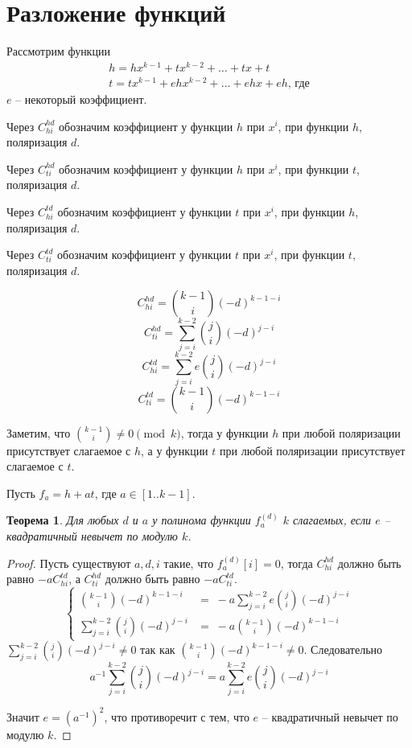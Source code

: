 \documentclass [12pt, a4paper] {article}
\newtheorem{myth}{Теорема}
\begin{document}
\section{Разложение функций}
Рассмотрим функции
\[ \begin{array}{l}
    h = hx^{k-1} + tx^{k-2} + \dots + tx + t \\
    t = tx^{k-1} + ehx^{k-2} + \dots + ehx + eh \text{, где}
\end{array} \]
$e$ -- некоторый коэффициент.

Через $C^{hd}_{hi}$ обозначим коэффициент у функции $h$ при $x^i$, при 
функции $h$, поляризация $d$.

Через $C^{hd}_{ti}$ обозначим коэффициент у функции $h$ при $x^i$, при 
функции $t$, поляризация $d$.

Через $C^{td}_{hi}$ обозначим коэффициент у функции $t$ при $x^i$, при 
функции $h$, поляризация $d$.

Через $C^{td}_{ti}$ обозначим коэффициент у функции $t$ при $x^i$, при 
функции $t$, поляризация $d$.

\[ C^{hd}_{hi} = \binom{k-1}{i}(-d)^{k-1-i} \]
\[ C^{hd}_{ti} = \sum_{j=i}^{k-2} \binom{j}{i}(-d)^{j-i} \]
\[ C^{td}_{hi} = \sum_{j=i}^{k-2} e \binom{j}{i}(-d)^{j-i} \]
\[ C^{td}_{ti} = \binom{k-1}{i}(-d)^{k-1-i} \]

Заметим, что $\binom{k-1}{i} \neq 0 \pmod k$, тогда у функции $h$ при любой
поляризации присутствует слагаемое с $h$, а у функции $t$ при любой поляризации
присутствует слагаемое с $t$.

Пусть $f_a = h + at$, где $a \in [1 .. k-1]$.

\begin{myth}
    Для любых $d$ и $a$ у полинома функции $f^{(d)}_a$ $k$ слагаемых, если $e$
    -- квадратичный невычет по модулю $k$.
\end{myth}
\begin{proof}
    Пусть существуют $a, d, i$ такие, что $f^{(d)}_a[i] = 0$, тогда
    $C^{hd}_{hi}$ должно быть равно $-a C^{td}_{hi}$, а $C^{hd}_{ti}$ должно
    быть равно $-a C^{td}_{ti}$.
    \begin{equation*}
        \begin{cases}
            \binom{k-1}{i}(-d)^{k-1-i} & = \; 
                -a \sum\limits_{j=i}^{k-2} e \binom{j}{i} (-d)^{j-i} \\
            \sum\limits_{j=i}^{k-2} \binom{j}{i} (-d)^{j-i} & = \;
                -a \binom{k-1}{i}(-d)^{k-1-i} 
        \end{cases}
    \end{equation*} 
    $\sum\limits_{j=i}^{k-2} \binom{j}{i} (-d)^{j-i} \neq 0$ так как
    $\binom{k-1}{i}(-d)^{k-1-i} \neq 0$.
    Следовательно 
    \[
        a^{-1} \sum_{j=i}^{k-2} \binom{j}{i} (-d)^{j-i} =
            a \sum_{j=i}^{k-2} e \binom{j}{i} (-d)^{j-i}
    \]

    Значит $e = (a^{-1})^2$, что противоречит с тем, что $e$ -- квадратичный
    невычет по модулю $k$.
\end{proof}
\end{document}
